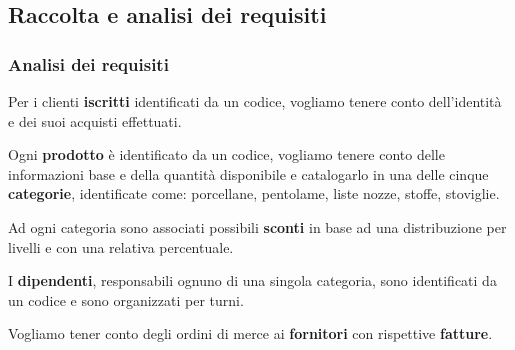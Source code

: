 \subsection{Raccolta e analisi dei requisiti}

\subsubsection{Analisi dei requisiti}
Per i clienti \textbf{iscritti} identificati da un codice, vogliamo tenere conto dell'identit\`a e dei suoi acquisti effettuati.



Ogni \textbf{prodotto} \`e identificato da un codice, vogliamo tenere conto delle informazioni base e della quantit\`a disponibile e catalogarlo in una delle cinque \textbf{categorie}, identificate come: porcellane, pentolame, liste nozze, stoffe, stoviglie.


Ad ogni categoria sono associati possibili \textbf{sconti} in base ad una distribuzione per livelli e con una relativa percentuale.


I \textbf{dipendenti}, responsabili ognuno di una singola categoria, sono identificati da un codice e sono organizzati per turni.


Vogliamo tener conto degli ordini di merce ai \textbf{fornitori} con rispettive \textbf{fatture}. \\


